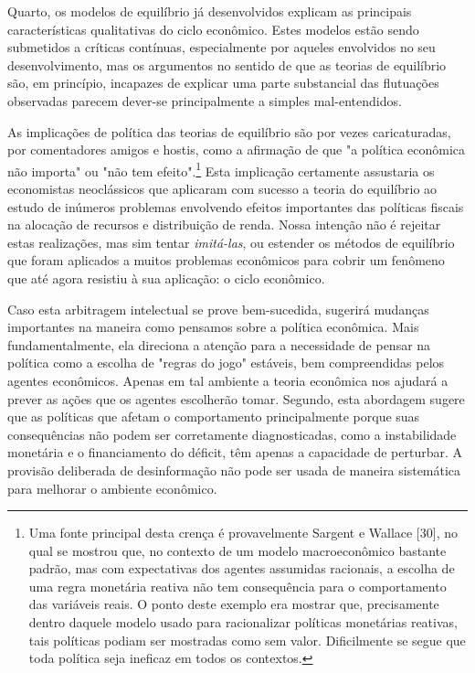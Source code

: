 \documentclass[12pt]{article}
\begin{document}
Quarto, os modelos de equilíbrio já desenvolvidos explicam as principais características qualitativas do ciclo econômico. Estes modelos estão sendo submetidos a críticas contínuas, especialmente por aqueles envolvidos no seu desenvolvimento, mas os argumentos no sentido de que as teorias de equilíbrio são, em princípio, incapazes de explicar uma parte substancial das flutuações observadas parecem dever-se principalmente a simples mal-entendidos.

As implicações de política das teorias de equilíbrio são por vezes caricaturadas, por comentadores amigos e hostis, como a afirmação de que "a política econômica não importa" ou "não tem efeito".\footnote{Uma fonte principal desta crença é provavelmente Sargent e Wallace [30], no qual se mostrou que, no contexto de um modelo macroeconômico bastante padrão, mas com expectativas dos agentes assumidas racionais, a escolha de uma regra monetária reativa não tem consequência para o comportamento das variáveis reais. O ponto deste exemplo era mostrar que, precisamente dentro daquele modelo usado para racionalizar políticas monetárias reativas, tais políticas podiam ser mostradas como sem valor. Dificilmente se segue que toda política seja ineficaz em todos os contextos.} Esta implicação certamente assustaria os economistas neoclássicos que aplicaram com sucesso a teoria do equilíbrio ao estudo de inúmeros problemas envolvendo efeitos importantes das políticas fiscais na alocação de recursos e distribuição de renda. Nossa intenção não é rejeitar estas realizações, mas sim tentar \textit{imitá-las}, ou estender os métodos de equilíbrio que foram aplicados a muitos problemas econômicos para cobrir um fenômeno que até agora resistiu à sua aplicação: o ciclo econômico.

Caso esta arbitragem intelectual se prove bem-sucedida, sugerirá mudanças importantes na maneira como pensamos sobre a política econômica. Mais fundamentalmente, ela direciona a atenção para a necessidade de pensar na política como a escolha de "regras do jogo" estáveis, bem compreendidas pelos agentes econômicos. Apenas em tal ambiente a teoria econômica nos ajudará a prever as ações que os agentes escolherão tomar. Segundo, esta abordagem sugere que as políticas que afetam o comportamento principalmente porque suas consequências não podem ser corretamente diagnosticadas, como a instabilidade monetária e o financiamento do déficit, têm apenas a capacidade de perturbar. A provisão deliberada de desinformação não pode ser usada de maneira sistemática para melhorar o ambiente econômico.
\end{document}
